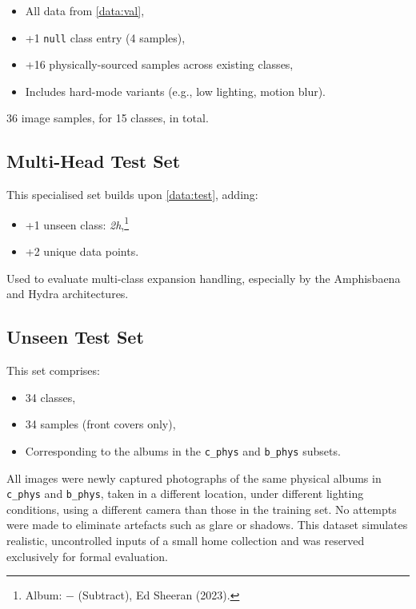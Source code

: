 \begin{uomappendix}
                \begin{itemize}
                    \item All data from \ref{data:val},
                    \item +1 \texttt{null} class entry (4 samples),
                    \item +16 physically-sourced samples across existing classes,
                    \item Includes hard-mode variants (e.g., low lighting, motion blur).
                \end{itemize}
    
                36 image samples, for 15 classes, in total.
    
            \subsection{Multi-Head Test Set} \label{data:test2}
    
                This specialised set builds upon \ref{data:test}, adding:
                \begin{itemize}
                    \item +1 unseen class: \textit{2h},\footnote{Album: − (Subtract), Ed Sheeran (2023).}
                    \item +2 unique data points.
                \end{itemize}
    
                Used to evaluate multi-class expansion handling, especially by the Amphisbaena and Hydra architectures.
    
            \subsection{Unseen Test Set}\label{data:trueTest}
    
                This set comprises:
                \begin{itemize}
                    \item 34 classes,
                    \item 34 samples (front covers only),
                    \item Corresponding to the albums in the \texttt{c\_phys} and \texttt{b\_phys} subsets.
                \end{itemize}
    
                All images were newly captured photographs of the same physical albums in \texttt{c\_phys} and \texttt{b\_phys}, taken in a different location, under different lighting conditions, using a different camera than those in the training set. No attempts were made to eliminate artefacts such as glare or shadows. This dataset simulates realistic, uncontrolled inputs of a small home collection and was reserved exclusively for formal evaluation.
    

\end{uomappendix}
